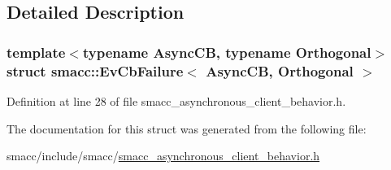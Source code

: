 \subsection{Detailed Description}
\subsubsection*{template$<$typename Async\+CB, typename Orthogonal$>$\newline
struct smacc\+::\+Ev\+Cb\+Failure$<$ Async\+C\+B, Orthogonal $>$}



Definition at line 28 of file smacc\+\_\+asynchronous\+\_\+client\+\_\+behavior.\+h.



The documentation for this struct was generated from the following file\+:\begin{DoxyCompactItemize}
\item 
smacc/include/smacc/\hyperlink{smacc__asynchronous__client__behavior_8h}{smacc\+\_\+asynchronous\+\_\+client\+\_\+behavior.\+h}\end{DoxyCompactItemize}
